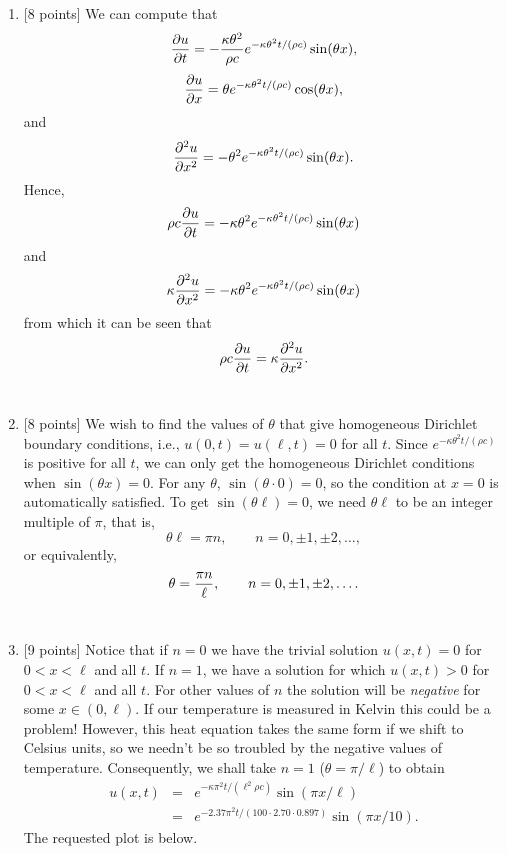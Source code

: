 \begin{solution}
\begin{enumerate}
\item {[8 points]} We can compute that
\[
{{\partial} u\over {\partial} t} = -\frac{\kappa \theta^2}{\rho c} e^{-\kappa \theta^2 t/(\rho c)} \sin(\theta x),
\]
\[
{{\partial} u\over {\partial} x} = \theta e^{-\kappa \theta^2 t/(\rho c)} \cos(\theta x),
\]
and
\[
{{\partial}^2 u\over {\partial} x^2} = -\theta^2 e^{-\kappa \theta^2 t/(\rho c)} \sin(\theta x).
\]
Hence,
\[
\rho c {{\partial} u \over {\partial} t} = -\kappa \theta^2 e^{-\kappa \theta^2 t/(\rho c)} \sin(\theta x)
\]
and
\[
\kappa {{\partial}^2 u\over {\partial}x^2} = -\kappa \theta^2 e^{-\kappa \theta^2 t/(\rho c)} \sin(\theta x)
\]
from which it can be seen that
\[
\rho c {{\partial} u \over {\partial} t} = \kappa {{\partial}^2 u\over {\partial}x^2}.
\]
\\
\item {[8 points]} We wish to find the values of $\theta$ that give homogeneous Dirichlet boundary conditions, i.e., $u(0,t) = u(\ell,t)=0$ for all $t$. Since $e^{-\kappa \theta^2 t/(\rho c)}$ is positive for all $t$, we can only get the homogeneous Dirichlet conditions when $\sin(\theta x)=0$. For any $\theta$, $\sin(\theta\cdot 0) = 0$, so the condition at $x=0$ is automatically satisfied.  To get $\sin(\theta \ell) = 0$, we need $\theta \ell$ to be an integer multiple of $\pi$, that is,
\[
\theta \ell = \pi n, \qquad n = 0, \pm 1, \pm 2, \ldots,
\]
or equivalently,
\[
\theta  = {\pi n\over \ell}, \qquad n = 0, \pm 1, \pm 2, \ldots.
\]
\\
\item {[9 points]} Notice that if $n=0$ we have the trivial solution $u(x,t) =0 $ for $0< x<\ell$ and all $t$. If $n=1$, we have a solution for which $u(x,t)>0$ for $0<x<\ell$ and all $t$. For other values of $n$ the solution will be \emph{negative} for some $x\in(0,\ell)$. If our temperature is measured in Kelvin this could be a problem! However, this heat equation takes the same form if we shift to Celsius units, so we needn't be so troubled by the negative values of temperature. Consequently, we shall take $n=1$ ($\theta = \pi/\ell$) to obtain
\begin{eqnarray*}
u(x,t) &=& e^{-\kappa \pi^2 t/(\ell^2 \rho c)} \sin(\pi x/\ell)
\\
&=& e^{-2.37 \pi^2 t/(100\cdot 2.70\cdot 0.897)} \sin(\pi x/10).
\end{eqnarray*}
The requested plot is below. 


\end{enumerate}
\end{solution}
